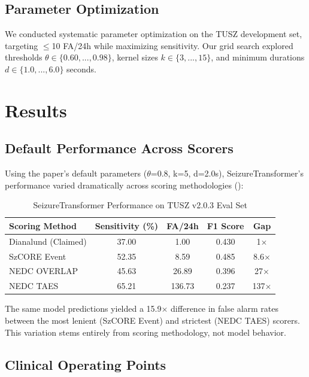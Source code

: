 \documentclass[10pt,a4paper]{article}
\begin{document}
\subsection{Parameter Optimization}

We conducted systematic parameter optimization on the TUSZ development set, targeting $\leq$10 FA/24h while maximizing sensitivity. Our grid search explored thresholds $\theta \in \{0.60, ..., 0.98\}$, kernel sizes $k \in \{3, ..., 15\}$, and minimum durations $d \in \{1.0, ..., 6.0\}$ seconds.

\section{Results}

\subsection{Default Performance Across Scorers}

Using the paper's default parameters ($\theta$=0.8, k=5, d=2.0s), SeizureTransformer's performance varied dramatically across scoring methodologies ():

\begin{table}[h]
\centering
\caption{SeizureTransformer Performance on TUSZ v2.0.3 Eval Set}
\label{tab:main_results}
\begin{tabular}{lcccc}
\toprule
\textbf{Scoring Method} & \textbf{Sensitivity (\%)} & \textbf{FA/24h} & \textbf{F1 Score} & \textbf{Gap} \\
\midrule
Dianalund (Claimed) & 37.00 & 1.00 & 0.430 & 1$\times$ \\
SzCORE Event & 52.35 & 8.59 & 0.485 & 8.6$\times$ \\
NEDC OVERLAP & 45.63 & 26.89 & 0.396 & 27$\times$ \\
NEDC TAES & 65.21 & 136.73 & 0.237 & 137$\times$ \\
\bottomrule
\end{tabular}
\end{table}

The same model predictions yielded a 15.9$\times$ difference in false alarm rates between the most lenient (SzCORE Event) and strictest (NEDC TAES) scorers. This variation stems entirely from scoring methodology, not model behavior.

\subsection{Clinical Operating Points}
\end{document}
